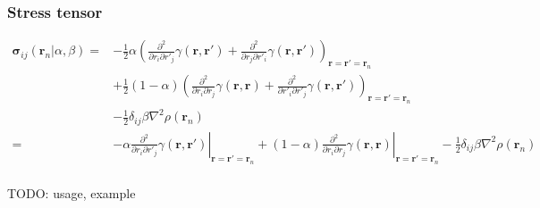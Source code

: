 \documentclass[letterpaper]{article}
\begin{document}
\subsubsection{Stress tensor}
\begin{equation}
  \begin{split}
    \boldsymbol{\sigma}_{ij}(\mathbf{r}_n | \alpha, \beta)
    =&
    -\frac{1}{2} \alpha
    \left(
      \frac{\partial^2}{\partial r_i \partial r'_j} \gamma(\mathbf{r}, \mathbf{r}')
      + \frac{\partial^2}{\partial r_j \partial r'_i} \gamma(\mathbf{r}, \mathbf{r}')
    \right)_{\mathbf{r} = \mathbf{r}' = \mathbf{r}_n}\\
    & +\frac{1}{2} (1 - \alpha)
    \left(
      \frac{\partial^2}{\partial r_i \partial r_j} \gamma(\mathbf{r}, \mathbf{r})
      + \frac{\partial^2}{\partial r'_i \partial r'_j} \gamma(\mathbf{r}, \mathbf{r}')
    \right)_{\mathbf{r} = \mathbf{r}' = \mathbf{r}_n}\\
    & - \frac{1}{2} \delta_{ij} \beta \nabla^2 \rho(\mathbf{r}_n)\\
    =&
    - \alpha
    \left.
      \frac{\partial^2}{\partial r_i \partial r'_j} \gamma(\mathbf{r}, \mathbf{r}')
    \right|_{\mathbf{r} = \mathbf{r}' = \mathbf{r}_n}
    + (1 - \alpha)
    \left.
      \frac{\partial^2}{\partial r_i \partial r_j} \gamma(\mathbf{r}, \mathbf{r})
    \right|_{\mathbf{r} = \mathbf{r}' = \mathbf{r}_n}
    - \frac{1}{2} \delta_{ij} \beta \nabla^2 \rho(\mathbf{r}_n)\\
  \end{split}
\end{equation}

TODO: usage, example
\end{document}
